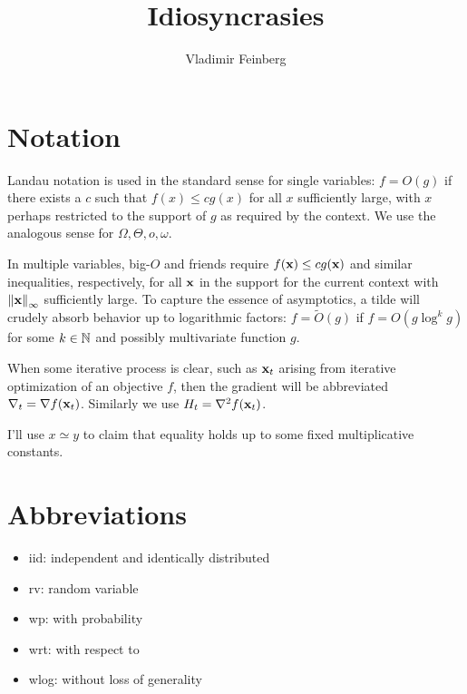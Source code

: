 \documentclass{article}
\title{Idiosyncrasies}
\author{Vladimir Feinberg}
\begin{document}
\maketitle

\section{Notation}

Landau notation is used in the standard sense for single variables: $f=O(g)$ if there exists a $c$ such that $f(x)\le cg(x)$ for all $x$ sufficiently large, with $x$ perhaps restricted to the support of $g$ as required by the context. We use the analogous sense for $\Omega,\Theta,o,\omega$.

In multiple variables, big-$O$ and friends require $f(\textbf{x})\le cg(\textbf{x})$ and similar inequalities, respectively, for all $\textbf{x}$ in the support for the current context with $\left\| \textbf{x} \right\|_\infty$ sufficiently large. To capture the essence of asymptotics, a tilde will crudely absorb behavior up to logarithmic factors: $f=\tilde{O}(g)$ if $f=O(g\log^k g)$ for some $k\in\mathbb{N}$ and possibly multivariate function $g$.

When some iterative process is clear, such as $\textbf{x}_t$ arising from iterative optimization of an objective $f$, then the gradient will be abbreviated $\nabla_t=\nabla f(\textbf{x}_t)$. Similarly we use $H_t=\nabla^2f(\textbf{x}_t)$.

I'll use $x\simeq y$ to claim that equality holds up to some fixed multiplicative constants.

\section{Abbreviations}

\begin{itemize}
\item iid: independent and identically distributed
\item rv: random variable
\item wp: with probability
\item wrt: with respect to
\item wlog: without loss of generality
  \end{itemize}
\end{document}
